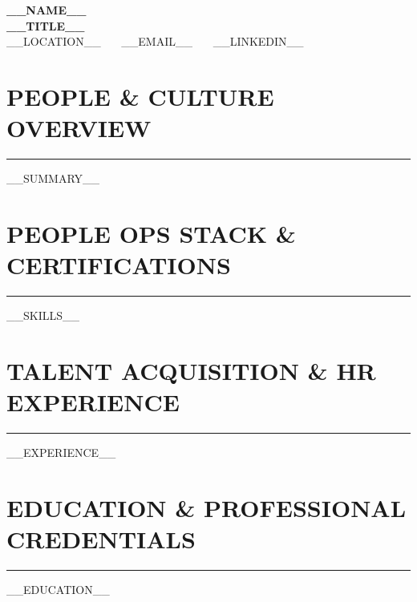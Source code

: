\documentclass[10pt,letterpaper]{article}
\begin{document}
\begin{center}
    {\LARGE \textbf{\color{darkgray} __NAME__}} \\ \vspace{2pt}
    {\large \textbf{__TITLE__}} \\ \vspace{2pt}
    \small __LOCATION__ \ \textbar\ \ __EMAIL__ \ \textbar\ \ __LINKEDIN__
\end{center}

\vspace{-4pt}
\section*{\large\bfseries\color{primary}\uppercase{People & Culture Overview}}
\vspace{-4pt}\rule{\textwidth}{0.8pt}\vspace{3pt}
__SUMMARY__

\section*{\large\bfseries\color{primary}\uppercase{People Ops Stack \& Certifications}}
\vspace{-4pt}\rule{\textwidth}{0.8pt}\vspace{3pt}
\small
__SKILLS__

\section*{\large\bfseries\color{primary}\uppercase{Talent Acquisition \& HR Experience}}
\vspace{-4pt}\rule{\textwidth}{0.8pt}\vspace{3pt}
\small
__EXPERIENCE__

\section*{\large\bfseries\color{primary}\uppercase{Education \& Professional Credentials}}
\vspace{-4pt}\rule{\textwidth}{0.8pt}\vspace{3pt}
\small
__EDUCATION__
\end{document}
